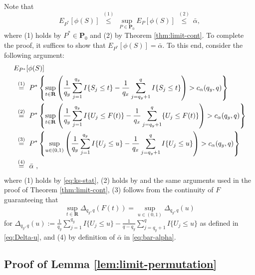 \documentclass[11pt]{article}
\numberwithin{equation}{section}
\begin{document}
Note that
\begin{equation*}
E_{P^{\ast }}[\phi (S)]~\overset{(1)}{\leq }~\sup_{P\in \mathbf{P}_{0}}E_{P}[\phi (S)]~\overset{(2)}{\leq }~\bar{\alpha},
\end{equation*}
where (1) holds by $P^{\ast }\in \mathbf{P}_{0}$ and (2) by Theorem \ref{thm:limit-cont}. To complete the proof, it suffices to show that $E_{P^{\ast }}[\phi (S)]=\bar{\alpha}$. To this end, consider the following argument: 
\begin{align}
 &E_{P^{\ast }}[\phi (S)]\notag\\
 &~\overset{(1)}{=}~P^*\left\{ \sup_{t\in \mathbf{R} }\left( \frac{1}{q_{y}}\sum_{j=1}^{q_{y}}I\{S_{j}\leq t\}-\frac{1}{q_{x}} \sum_{j=q_{y}+1}^{q}I\{S_{j}\leq t\}\right) >c_{\alpha }(q_{y},q)\right\}  \notag\\
&~\overset{(2)}{=}~P^*\left\{ \sup_{t\in \mathbf{R}}\left( \frac{1}{q_{y}} \sum_{j=1}^{q_{y}}I\{U_{j}\leq F(t)\}-\frac{1}{q_{x}}\sum_{j=q_{y}+1}^{q}\{U_{j}\leq F(t)\}\right) >c_{\alpha }(q_{y},q)\right\}   \notag\\
&~\overset{(3)}{=}~P^*\left\{ \sup_{u\in (0,1)}\left( \frac{1}{q_{y}} \sum_{j=1}^{q_{y}}I\{U_{j}\leq u\}-\frac{1}{q_{x}}\sum_{j=q_{y}+1}^{q}I \{U_{j}\leq u\}\right) >c_{\alpha }(q_{y},q)\right\}  \notag\\
&~ \overset{(4)}{=}~\bar{\alpha}~,\label{eq:limit-exact_0}
\end{align}
where (1) holds by \eqref{eq:ks-stat}, (2) holds by \citet[][Eq.\ 36]{pollard:02} and the same arguments used in the proof of Theorem \ref{thm:limit-cont}, (3) follows from the continuity of $F$ guaranteeing that 
\begin{equation*}
 \sup_{t\in \mathbf{R}} \Delta_{q_y,q}\left(F(t)\right) = \sup_{u\in (0,1)} \Delta_{q_y,q}(u)
\end{equation*} 
for $ \Delta_{q_y,q}(u) := \frac{1}{q_y}\sum_{j=1}^{q_y} I\{U_{j} \le u\}-\frac{1}{q-q_y}\sum_{j=q_y+1}^{q} I\{U_{j} \le u\}$ as defined in \eqref{eq:Delta-u}, and (4) by definition of $\bar{\alpha}$ in \eqref{eq:bar-alpha}.

\subsection{Proof of Lemma \ref{lem:limit-permutation}}
\end{document}
